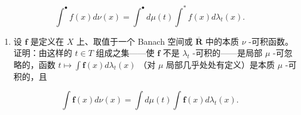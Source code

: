 \[
\int^ {\bullet} f (x) d \nu (x) = \int^ {\bullet} d \mu (t) \int^ {*} f (x) d \lambda_ {t} (x).
\]

\begin{enumerate}
\def\labelenumi{\alph{enumi})}
\setcounter{enumi}{4}
\tightlist
\item
  设 \(\mathbf{f}\) 是定义在 \(X\) 上、取值于一个 Banach 空间或 \(\overline{\mathbf{R}}\) 中的本质 \(\nu\) -可积函数。证明：由这样的 \(t \in T\) 组成之集——使 \(\mathbf{f}\) 不是 \(\lambda_t\) -可积的——是局部 \(\mu\) -可忽略的，函数 \(t \mapsto \int \mathbf{f}(x) d\lambda_t(x)\) （对 \(\mu\) 局部几乎处处有定义）是本质 \(\mu\) -可积的，且
\end{enumerate}

\[
\int \mathbf {f} (x) d \nu (x) = \int d \mu (t) \int \mathbf {f} (x) d \lambda_ {t} (x).
\]

\setcounter{exercisegroup}{4}
\edef\CurrentExerciseGroup{\arabic{exercisegroup}}
